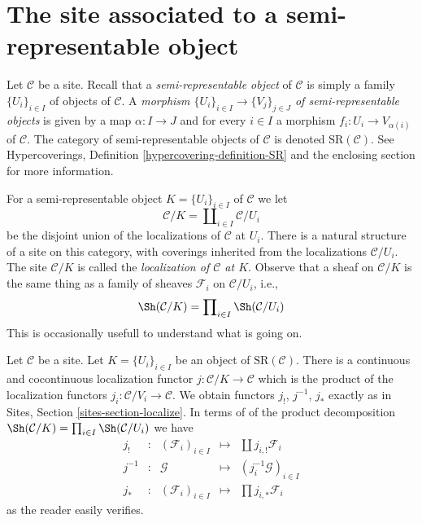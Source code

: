 \section{The site associated to a semi-representable object}
\label{section-semi-representable}

\noindent
Let $\mathcal{C}$ be a site. Recall that a {\it semi-representable object}
of $\mathcal{C}$ is simply a family $\{U_i\}_{i \in I}$
of objects of $\mathcal{C}$. A
{\it morphism $\{U_i\}_{i \in I} \to \{V_j\}_{j \in J}$ of
semi-representable objects} is given by a map $\alpha : I \to J$
and for every $i \in I$ a morphism $f_i : U_i \to V_{\alpha(i)}$
of $\mathcal{C}$.
The category of semi-representable objects of $\mathcal{C}$
is denoted $\text{SR}(\mathcal{C})$.
See Hypercoverings, Definition \ref{hypercovering-definition-SR}
and the enclosing section for more information.

\medskip\noindent
For a semi-representable object $K = \{U_i\}_{i \in I}$ of $\mathcal{C}$
we let
$$
\mathcal{C}/K = \coprod\nolimits_{i \in I} \mathcal{C}/U_i
$$
be the disjoint union of the localizations of $\mathcal{C}$ at $U_i$.
There is a natural structure of a site on this category, with
coverings inherited from the localizations $\mathcal{C}/U_i$.
The site $\mathcal{C}/K$ is called the
{\it localization of $\mathcal{C}$ at $K$}.
Observe that a sheaf on $\mathcal{C}/K$ is the same thing as
a family of sheaves $\mathcal{F}_i$ on $\mathcal{C}/U_i$, i.e.,
$$
\Sh(\mathcal{C}/K) = \prod\nolimits_{i \in I} \Sh(\mathcal{C}/U_i)
$$
This is occasionally usefull to understand what is going on.

\medskip\noindent
Let $\mathcal{C}$ be a site. Let $K = \{U_i\}_{i \in I}$ be an object of
$\text{SR}(\mathcal{C})$. There is a continuous and cocontinuous
localization functor $j : \mathcal{C}/K \to \mathcal{C}$ which is
the product of the localization functors
$j_i : \mathcal{C}/V_i \to \mathcal{C}$.
We obtain functors $j_!$, $j^{-1}$, $j_*$ exactly
as in Sites, Section \ref{sites-section-localize}.
In terms of of the product decomposition
$\Sh(\mathcal{C}/K) = \prod\nolimits_{i \in I} \Sh(\mathcal{C}/U_i)$
we have
$$
\begin{matrix}
j_! & : &
(\mathcal{F}_i)_{i \in I} &
\longmapsto &
\coprod j_{i, !}\mathcal{F}_i \\
j^{-1} & : &
\mathcal{G} &
\longmapsto &
(j_i^{-1}\mathcal{G})_{i \in I} \\
j_* & : &
(\mathcal{F}_i)_{i \in I} &
\longmapsto &
\prod j_{i, *}\mathcal{F}_i
\end{matrix}
$$
as the reader easily verifies.


